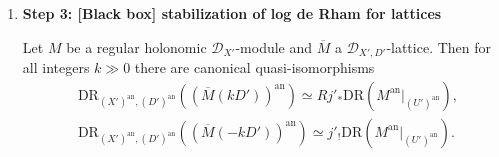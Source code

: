 \begin{remark}
\begin{enumerate}
              Given any $\mathcal O_{X'}$-module $\mathcal F$, define the twist
              \[
                  \mathcal F(kD'):=\mathcal F\otimes_{\mathcal O_{X'}}\mathcal O_{X'}(kD').
              \]
              Then for such $\overline M$ one defines the logarithmic de Rham complex
              \begin{align*}
                   & \mathrm{DR}_{\left((X')^\mathrm{an},(D')^\mathrm{an}\right)}\left((\overline M)^\mathrm{an}\right)                                                                                                                                                                                            \\
                   & :=\omega_{(X')^\mathrm{an}}((D')^\mathrm{an})\otimes^{\mathbf L}_{\mathcal D_{(X')^\mathrm{an}, (D')^\mathrm{an}}}(\overline M)^\mathrm{an}                                                                                                                                                   \\
                   & \simeq [(\overline M)^\mathrm{an}\to \Omega^1_{(X')^\mathrm{an}}(\log (D')^\mathrm{an})\otimes_{\mathcal{O}_{(X')^\mathrm{an}}} (\overline M)^\mathrm{an}\to \cdots \to \Omega^n_{(X')^\mathrm{an}}(\log (D')^\mathrm{an})\otimes_{\mathcal{O}_{(X')^\mathrm{an}}} (\overline M)^\mathrm{an}] \\
                   & \text{(Last isomorphism claimed in \cite[\S3.1]{Wu2021CharacteristicCyclesHolonomicDmodules})}.
              \end{align*}


        \item \textbf{Step 3: [Black box] stabilization of log de Rham for lattices}

              \begin{theorem}
                  Let $M$ be a regular holonomic $\mathcal D_{X'}$-module and $\overline M$ a $\mathcal D_{X',D'}$-lattice.
                  Then for all integers $k\gg 0$ there are canonical quasi-isomorphisms
                  \begin{align*}
                       & \mathrm{DR}_{(X')^\mathrm{an},(D')^\mathrm{an}}((\overline M(kD'))^\mathrm{an})   \simeq Rj'_*\mathrm{DR}(M^\mathrm{an}|_{(U')^\mathrm{an}}), \\
                       & \mathrm{DR}_{(X')^\mathrm{an},(D')^\mathrm{an}}((\overline M(-kD'))^\mathrm{an})  \simeq j'_!\mathrm{DR}(M^\mathrm{an}|_{(U')^\mathrm{an}}).
                  \end{align*}
              \end{theorem}


\end{enumerate}
\end{remark}
